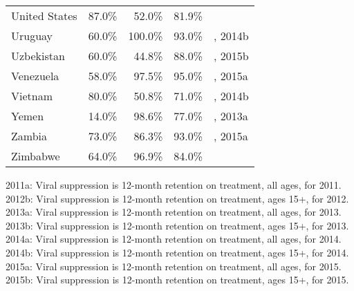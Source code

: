 \begin{longtable}{lrrrl}
 United States & 87.0\% & 52.0\% & 81.9\% & \cite{cdc2012a,cdc2014} \\
  Uruguay & 60.0\% & 100.0\% & 93.0\% & \cite{Unaids2016-an}, 2014b \\
  Uzbekistan & 60.0\% & 44.8\% & 88.0\% & \cite{Unaids2016-an}, 2015b \\
  Venezuela & 58.0\% & 97.5\% & 95.0\% & \cite{Unaids2016-an}, 2015a \\
  Vietnam & 80.0\% & 50.8\% & 71.0\% & \cite{Unaids2016-an}, 2014b \\
  Yemen & 14.0\% & 98.6\% & 77.0\% & \cite{Unaids2016-an}, 2013a \\
  Zambia & 73.0\% & 86.3\% & 93.0\% & \cite{Unaids2016-an}, 2015a \\
  Zimbabwe & 64.0\% & 96.9\% & 84.0\% & \cite{Unaids2016-an} \\
  \hline
\end{longtable}
2011a: Viral suppression is 12-month retention on treatment, all ages, for 2011.
2012b: Viral suppression is 12-month retention on treatment, ages 15+, for 2012.
2013a: Viral suppression is 12-month retention on treatment, all ages, for 2013.
2013b: Viral suppression is 12-month retention on treatment, ages 15+, for 2013.
2014a: Viral suppression is 12-month retention on treatment, all ages, for 2014.
2014b: Viral suppression is 12-month retention on treatment, ages 15+, for 2014.
2015a: Viral suppression is 12-month retention on treatment, all ages, for 2015.
2015b: Viral suppression is 12-month retention on treatment, ages 15+, for 2015.
